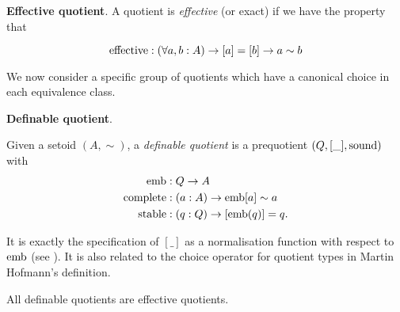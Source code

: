 \begin{definition}
\textbf{Effective quotient}.
\noindent
A quotient is \emph{effective} (or exact) if we have the property that

$$\text{effective} :(\forall a,b : A) \rightarrow  [a] = [b] \rightarrow a \sim b$$
\end{definition}

We now consider a specific group of quotients which have a canonical choice in each equivalence class.

\begin{definition}\label{defquo}
 \textbf{Definable quotient}.

\noindent
Given a setoid $(A,\sim)$, a \emph{definable quotient} is a
prequotient $(Q, [\_], \operatorname{sound})$ with 
\begin{align*}
\operatorname{emb} &: Q \rightarrow A\\
\operatorname{complete} &: (a : A) \rightarrow \operatorname{emb} [a] \sim a\\
\operatorname{stable} &: (q:Q) \rightarrow [\operatorname{emb}(q)] = q.
\end{align*}
\end{definition}

It is exactly the specification of $[\_]$ as a normalisation function with respect to $\operatorname{emb}$ (see \cite{DBLP:journals/jfp/AltenkirchC09}). It is also related to the choice operator for quotient types in Martin Hofmann's definition\cite{hof:95:sm}.


\begin{proposition}
All definable quotients are effective quotients.
\end{proposition}

